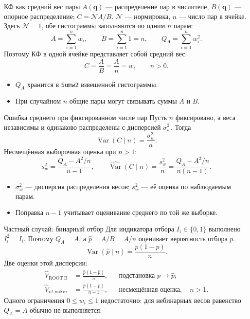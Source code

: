 \begin{frame}{КФ как средний вес пары}
    \small
    $A(\mathbf q)$ --- распределение пар в числителе,
    $B(\mathbf q)$ --- опорное распределение; $C=\mathcal{N}A/B$.
    $\mathcal{N}$ --- нормировка, $n$ --- число пар в ячейке.
    Здесь $\mathcal{N}=1$, обе гистограммы заполняются по одним $n$ парам:
    \[
        A = \sum_{i=1}^{n} w_i, \qquad
        B = \sum_{i=1}^{n} 1 = n, \qquad Q_A = \sum_{i=1}^{n} w_i^2.
    \]
    Поэтому КФ в одной ячейке представляет собой средний вес:
    \[
        C = \frac{A}{B} = \frac{A}{n} = \overline{w}, \qquad n>0.
    \]
    \begin{itemize}
        \item $Q_A$ хранится в \texttt{Sumw2} взвешенной гистограммы.
        \item При случайном $n$ общие пары могут связывать суммы $A$ и $B$.
    \end{itemize}
\end{frame}

\begin{frame}{Ошибка среднего при фиксированном числе пар}
    \small
    Пусть $n$ фиксировано, а веса независимы и одинаково распределены
    с дисперсией $\sigma_w^2$. Тогда
    \[
        \operatorname{Var}(C\mid n) = \frac{\sigma_w^2}{n}.
    \]
    Несмещённая выборочная оценка при $n>1$:
    \[
        s_w^2 = \frac{Q_A-A^2/n}{n-1}, \qquad
        \widehat{\operatorname{Var}}(C\mid n)
        = \frac{s_w^2}{n}
        = \frac{Q_A-A^2/n}{n(n-1)}.
    \]
    \begin{itemize}
        \item $\sigma_w^2$ --- дисперсия распределения весов;
              $s_w^2$ --- её оценка по наблюдаемым парам.
        \item Поправка $n-1$ учитывает оценивание среднего по той же выборке.
    \end{itemize}
\end{frame}

\begin{frame}{Частный случай: бинарный отбор}
    \small
    Для индикатора отбора $I_i\in\{0,1\}$ выполнено $I_i^2=I_i$.
    Поэтому $Q_A=A$, а $\widehat p=A/B=A/n$ оценивает вероятность отбора $p$.
    \[
        \operatorname{Var}(\widehat p\mid n) = \frac{p(1-p)}{n}.
    \]
    Две оценки этой дисперсии:
    \[
        \begin{aligned}
            \widehat V_{\mathrm{ROOT\ B}}
                &= \frac{\widehat p(1-\widehat p)}{n},
                &&\text{подстановка }p\to\widehat p;\\
            \widehat V_{\texttt{cf\_maker}}
                &= \frac{\widehat p(1-\widehat p)}{n-1},
                &&\text{несмещённая оценка},\quad n>1.
        \end{aligned}
    \]
    Одного ограничения $0\leq w_i\leq 1$ недостаточно:
    для небинарных весов равенство $Q_A=A$ обычно не выполняется.
\end{frame}

